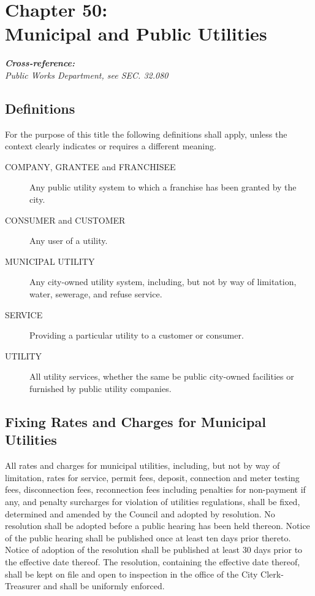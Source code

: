 \chapter*{Chapter 50: \\
	Municipal and Public Utilities}
    \vfill
    \minitoc
    \textbf{\emph{{Cross-reference:}}}\\
    \indent\emph{Public Works Department, see SEC. 32.080}
    \pagebreak


\section{Definitions}
For the purpose of this title the following definitions shall apply, unless the context clearly indicates or requires a different meaning.
\begin{description}
\item[COMPANY, GRANTEE and FRANCHISEE] Any public utility system to which a franchise has been granted by the city.
\item[CONSUMER and CUSTOMER] Any user of a utility.
\item[MUNICIPAL UTILITY] Any city-owned utility system, including, but not by way of limitation, water, sewerage, and refuse service.
\item[SERVICE] Providing a particular utility to a customer or consumer.
\item[UTILITY] All utility services, whether the same be public city-owned facilities or furnished by public utility companies.
\end{description}

\section{Fixing Rates and Charges for Municipal Utilities}
All rates and charges for municipal utilities, including, but not by way of limitation, rates for service, permit fees, deposit, connection and meter testing fees, disconnection fees, reconnection fees including penalties for non-payment if any, and penalty surcharges for violation of utilities regulations, shall be fixed, determined and amended by the Council and adopted by resolution.  No resolution shall be adopted before a public hearing has been held thereon.  Notice of the public hearing shall be published once at least ten days prior thereto.  Notice of adoption of the resolution shall be published at least 30 days prior to the effective date thereof.  The resolution, containing the effective date thereof, shall be kept on file and open to inspection in the office of the City Clerk-Treasurer and shall be uniformly enforced.
